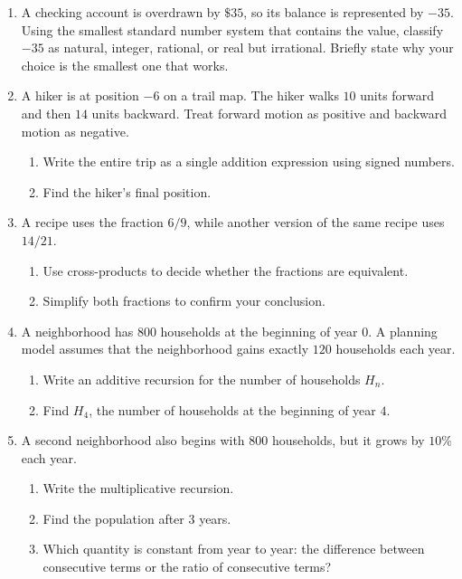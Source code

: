 \documentclass[11pt]{article}
\newcommand{\workmed}{\par\vspace{0.62in}}
\newcommand{\worklarge}{\par\vspace{0.92in}}
\begin{document}
\begin{enumerate}
\item A checking account is overdrawn by \(\$35\), so its balance is represented by \(-35\). Using the smallest standard number system that contains the value, classify \(-35\) as natural, integer, rational, or real but irrational. Briefly state why your choice is the smallest one that works.
\workmed

\item A hiker is at position \(-6\) on a trail map. The hiker walks \(10\) units forward and then \(14\) units backward. Treat forward motion as positive and backward motion as negative.
\begin{enumerate}[label=(\alph*),itemsep=4pt]
\item Write the entire trip as a single addition expression using signed numbers.
\item Find the hiker's final position.
\end{enumerate}
\worklarge

\item A recipe uses the fraction \(6/9\), while another version of the same recipe uses \(14/21\).
\begin{enumerate}[label=(\alph*),itemsep=4pt]
\item Use cross-products to decide whether the fractions are equivalent.
\item Simplify both fractions to confirm your conclusion.
\end{enumerate}
\worklarge

\item A neighborhood has \(800\) households at the beginning of year \(0\). A planning model assumes that the neighborhood gains exactly \(120\) households each year.
\begin{enumerate}[label=(\alph*),itemsep=4pt]
\item Write an additive recursion for the number of households \(H_n\).
\item Find \(H_4\), the number of households at the beginning of year \(4\).
\end{enumerate}
\worklarge

\item A second neighborhood also begins with \(800\) households, but it grows by \(10\%\) each year.
\begin{enumerate}[label=(\alph*),itemsep=4pt]
\item Write the multiplicative recursion.
\item Find the population after \(3\) years.
\item Which quantity is constant from year to year: the difference between consecutive terms or the ratio of consecutive terms?
\end{enumerate}
\worklarge
\end{enumerate}
\end{document}
